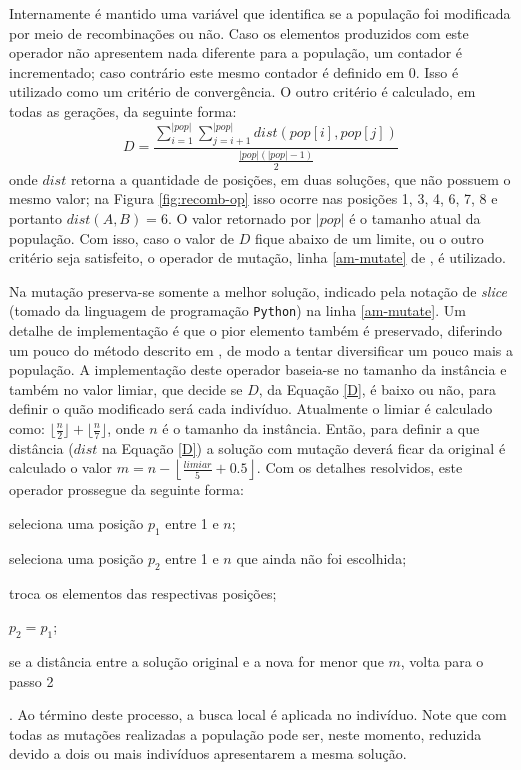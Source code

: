 Internamente é mantido uma variável que identifica se a população foi
modificada por meio de recombinações ou não. Caso os elementos
produzidos com este operador não apresentem nada diferente para a
população, um contador é incrementado; caso contrário este mesmo
contador é definido em 0. Isso é utilizado como um critério de
convergência. O outro critério é calculado, em todas as gerações, da
seguinte forma:
\begin{equation}\label{D}
D = \frac{\sum\limits_{i = 1}^{|pop|} \sum\limits_{j = i + 1}^{|pop|} dist(pop[i],
  pop[j])}{\frac{|pop| (|pop| - 1)}{2}}
\end{equation}
onde $dist$ retorna a quantidade de posições, em duas soluções, que
não possuem o mesmo valor; na Figura \ref{fig:recomb-op} isso ocorre
nas posições 1, 3, 4, 6, 7, 8 e portanto $dist(A, B) = 6$. O valor
retornado por $|pop|$ é o tamanho atual da população. Com isso, caso o
valor de $D$ fique abaixo de um limite, ou o outro critério seja
satisfeito, o operador de mutação, linha \ref{am-mutate} de
, é utilizado.

Na mutação preserva-se somente a melhor solução, indicado pela notação
de \textit{slice} (tomado da linguagem de programação \texttt{Python})
na linha \ref{am-mutate}. Um detalhe de implementação é que o pior
elemento também é preservado, diferindo um pouco do método descrito em
\cite{merz_freisleben}, de modo a tentar diversificar um pouco mais a
população. A implementação deste operador baseia-se no tamanho da
instância e também no valor limiar,
que decide se $D$, da Equação \ref{D}, é baixo ou não, para definir o
quão modificado será cada indivíduo. Atualmente o limiar é calculado
como: $\lfloor\frac{n}{2}\rfloor
+\lfloor\frac{n}{7}\rfloor$, onde $n$ é o tamanho da
instância. Então, para definir a que
distância ($dist$ na Equação \ref{D}) a solução com mutação deverá
ficar da original é calculado o valor $m = n -
\left\lfloor\frac{limiar}{5} + 0.5\right\rfloor$. Com os detalhes
resolvidos, este operador prossegue da seguinte
forma: \begin{inparaenum}[(1)] \item seleciona uma posição $p_1$ entre 1 e
  $n$; \item seleciona uma posição $p_2$ entre 1 e $n$ que ainda não
  foi escolhida; \item troca os elementos das respectivas posições; \item
  $p_2 = p_1$; \item se a
  distância entre a solução original e a nova for menor que $m$, volta
  para o passo 2\end{inparaenum}. Ao término deste processo, a busca
local é aplicada no indivíduo. Note que com todas as mutações
realizadas a população pode ser, neste momento, reduzida devido a dois
ou mais indivíduos apresentarem a mesma solução.

